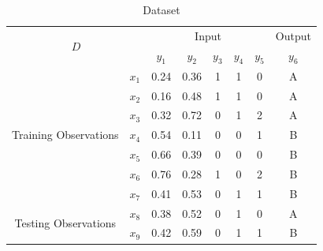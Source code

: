 \documentclass{article}
\begin{document}
\begin{table}[h!]
\centering
\label{tab:dataset1}
\begin{tabular}{|cc|ccccc|c|}
\hline
\multicolumn{2}{|c|}{\multirow{2}{*}{$D$}}                           & \multicolumn{5}{c|}{Input}                                                                                                & \multicolumn{1}{l|}{Output} \\ \cline{3-8} 
\multicolumn{2}{|c|}{}                                               & \multicolumn{1}{c|}{$y_1$} & \multicolumn{1}{c|}{$y_2$} & \multicolumn{1}{c|}{$y_3$} & \multicolumn{1}{c|}{$y_4$} & $y_5$ & $y_6$                       \\ \hline
\multicolumn{1}{|c|}{\multirow{7}{*}{Training Observations}} & $x_1$ & \multicolumn{1}{c|}{0.24}  & \multicolumn{1}{c|}{0.36}  & \multicolumn{1}{c|}{1}     & \multicolumn{1}{c|}{1}     & 0     & A                           \\ \cline{2-8} 
\multicolumn{1}{|c|}{}                                       & $x_2$ & \multicolumn{1}{c|}{0.16}  & \multicolumn{1}{c|}{0.48}  & \multicolumn{1}{c|}{1}     & \multicolumn{1}{c|}{1}     & 0     & A                           \\ \cline{2-8} 
\multicolumn{1}{|c|}{}                                       & $x_3$ & \multicolumn{1}{c|}{0.32}  & \multicolumn{1}{c|}{0.72}  & \multicolumn{1}{c|}{0}     & \multicolumn{1}{c|}{1}     & 2     & A                           \\ \cline{2-8} 
\multicolumn{1}{|c|}{}                                       & $x_4$ & \multicolumn{1}{c|}{0.54}  & \multicolumn{1}{c|}{0.11}  & \multicolumn{1}{c|}{0}     & \multicolumn{1}{c|}{0}     & 1     & B                           \\ \cline{2-8} 
\multicolumn{1}{|c|}{}                                       & $x_5$ & \multicolumn{1}{c|}{0.66}  & \multicolumn{1}{c|}{0.39}  & \multicolumn{1}{c|}{0}     & \multicolumn{1}{c|}{0}     & 0     & B                           \\ \cline{2-8} 
\multicolumn{1}{|c|}{}                                       & $x_6$ & \multicolumn{1}{c|}{0.76}  & \multicolumn{1}{c|}{0.28}  & \multicolumn{1}{c|}{1}     & \multicolumn{1}{c|}{0}     & 2     & B                           \\ \cline{2-8} 
\multicolumn{1}{|c|}{}                                       & $x_7$ & \multicolumn{1}{c|}{0.41}  & \multicolumn{1}{c|}{0.53}  & \multicolumn{1}{c|}{0}     & \multicolumn{1}{c|}{1}     & 1     & B                           \\ \hline
\multicolumn{1}{|c|}{\multirow{2}{*}{Testing Observations}}  & $x_8$ & \multicolumn{1}{c|}{0.38}  & \multicolumn{1}{c|}{0.52}  & \multicolumn{1}{c|}{0}     & \multicolumn{1}{c|}{1}     & 0     & A                           \\ \cline{2-8} 
\multicolumn{1}{|c|}{}                                       & $x_9$ & \multicolumn{1}{c|}{0.42}  & \multicolumn{1}{c|}{0.59}  & \multicolumn{1}{c|}{0}     & \multicolumn{1}{c|}{1}     & 1     & B                           \\ \hline
\end{tabular}
\caption{Dataset}
\end{table}
\end{document}
